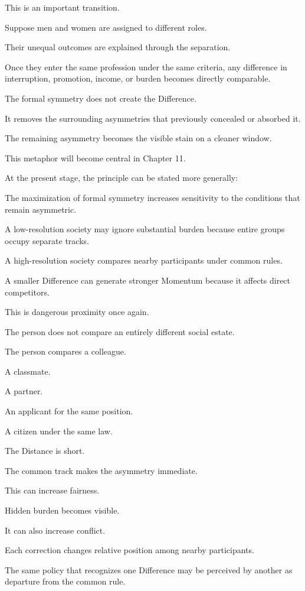 This is an important transition.

Suppose men and women are assigned to different roles.

Their unequal outcomes are explained through the separation.

Once they enter the same profession under the same criteria, any difference in interruption, promotion, income, or burden becomes directly comparable.

The formal symmetry does not create the Difference.

It removes the surrounding asymmetries that previously concealed or absorbed it.

The remaining asymmetry becomes the visible stain on a cleaner window.

This metaphor will become central in Chapter 11.

At the present stage, the principle can be stated more generally:

The maximization of formal symmetry increases sensitivity to the conditions that remain asymmetric.

A low-resolution society may ignore substantial burden because entire groups occupy separate tracks.

A high-resolution society compares nearby participants under common rules.

A smaller Difference can generate stronger Momentum because it affects direct competitors.

This is dangerous proximity once again.

The person does not compare an entirely different social estate.

The person compares a colleague.

A classmate.

A partner.

An applicant for the same position.

A citizen under the same law.

The Distance is short.

The common track makes the asymmetry immediate.

This can increase fairness.

Hidden burden becomes visible.

It can also increase conflict.

Each correction changes relative position among nearby participants.

The same policy that recognizes one Difference may be perceived by another as departure from the common rule.

